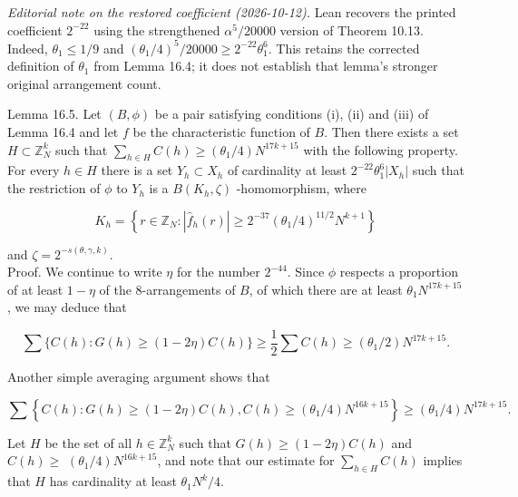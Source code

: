 \documentclass[10pt]{article}
\begin{document}
\emph{Editorial note on the restored coefficient (2026-10-12).}
Lean recovers the printed coefficient $2^{-22}$ using the strengthened
$\alpha^5/20000$ version of Theorem 10.13. Indeed, $\theta_1\leqslant1/9$
and $(\theta_1/4)^5/20000\geqslant2^{-22}\theta_1^6$.
This retains the corrected definition of $\theta_1$ from Lemma 16.4;
it does not establish that lemma's stronger original arrangement count.

Lemma 16.5. Let $(B, \phi)$ be a pair satisfying conditions (i), (ii) and (iii) of Lemma 16.4 and let $f$ be the characteristic function of $B$. Then there exists a set $H \subset \mathbb{Z}_{N}^{k}$ such that $\sum_{h \in H} C(h) \geqslant\left(\theta_{1} / 4\right) N^{17 k+15}$ with the following property. For every $h \in H$ there is a set $Y_{h} \subset X_{h}$ of cardinality at least $2^{-22} \theta_{1}^{6}\left|X_{h}\right|$ such that the restriction of $\phi$ to $Y_{h}$ is a $B\left(K_{h}, \zeta\right)$ -homomorphism, where

$$
K_{h}=\left\{r \in \mathbb{Z}_{N}:\left|\hat{f}_{h}(r)\right| \geqslant 2^{-37}\left(\theta_{1} / 4\right)^{11 / 2} N^{k+1}\right\}
$$

and $\zeta=2^{-s(\theta, \gamma, k)}$.\\
Proof. We continue to write $\eta$ for the number $2^{-44}$. Since $\phi$ respects a proportion of at least $1-\eta$ of the 8-arrangements of $B$, of which there are at least $\theta_{1} N^{17 k+15}$, we may deduce that

$$
\sum\{C(h): G(h) \geqslant(1-2 \eta) C(h)\} \geqslant \frac{1}{2} \sum C(h) \geqslant\left(\theta_{1} / 2\right) N^{17 k+15} .
$$

Another simple averaging argument shows that

$$
\sum\left\{C(h): G(h) \geqslant(1-2 \eta) C(h), C(h) \geqslant\left(\theta_{1} / 4\right) N^{16 k+15}\right\} \geqslant\left(\theta_{1} / 4\right) N^{17 k+15} .
$$

Let $H$ be the set of all $h \in \mathbb{Z}_{N}^{k}$ such that $G(h) \geqslant(1-2 \eta) C(h)$ and $C(h) \geqslant$ $\left(\theta_{1} / 4\right) N^{16 k+15}$, and note that our estimate for $\sum_{h \in H} C(h)$ implies that $H$ has cardinality at least $\theta_{1} N^{k} / 4$.
\end{document}
